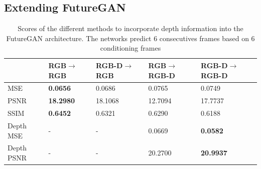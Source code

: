 \documentclass[10pt,twocolumn,letterpaper]{article}
\begin{document}
\subsection{Extending FutureGAN}
\begin{table}[H]
	\centering
	\begin{adjustbox}{max width=0.5\textwidth}
		\begin{tabular}{lllll}
			& RGB$\rightarrow$RGB & RGB-D$\rightarrow$RGB & RGB$\rightarrow$RGB-D & RGB-D$\rightarrow$RGB-D \\ \hline
			MSE        & \textbf{0.0656}       & 0.0686                  & 0.0765                  & 0.0749                    \\
			PSNR       & \textbf{18.2980}      & 18.1068                 & 12.7094                 & 17.7737                   \\
			SSIM       & \textbf{0.6452}       & 0.6321                  & 0.6290                  & 0.6188                    \\
			Depth MSE  & -                     & -                       & 0.0669                  & \textbf{0.0582}           \\
			Depth PSNR & -                     & -                       & 20.2700                 & \textbf{20.9937}          \\ \hline
		\end{tabular}
	\end{adjustbox}
	\caption{Scores of the different methods to incorporate depth information into the FutureGAN architecture. The networks predict 6 consecutives frames based on 6 conditioning frames}
	\label{tab:ablation_scores}
\end{table}
\end{document}
